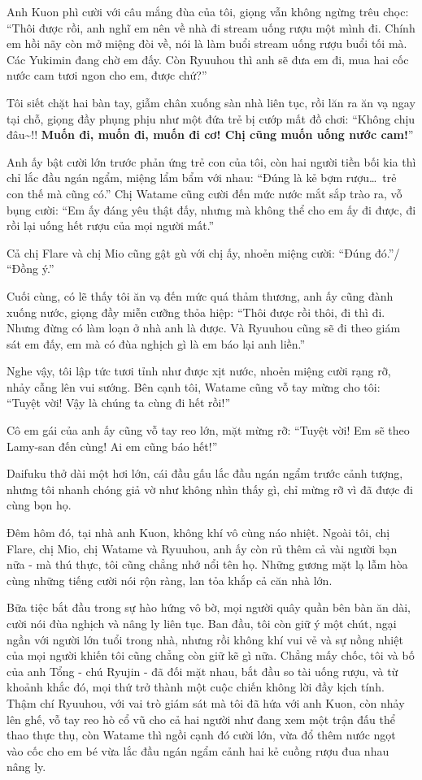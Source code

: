 \documentclass[../main.tex]{subfiles}
\begin{document}
Anh Kuon phì cười với câu mắng đùa của tôi, giọng vẫn không ngừng trêu chọc: ``Thôi được rồi, anh nghĩ em nên về nhà đi stream uống rượu một mình đi. Chính em hồi nãy còn mở miệng đòi về, nói là làm buổi stream uống rượu buổi tối mà. Các Yukimin đang chờ em đấy. Còn Ryuuhou thì anh sẽ đưa em đi, mua hai cốc nước cam tươi ngon cho em, được chứ?''

Tôi siết chặt hai bàn tay, giẫm chân xuống sàn nhà liên tục, rồi lăn ra ăn vạ ngay tại chỗ, giọng đầy phụng phịu như một đứa trẻ bị cướp mất đồ chơi: ``Không chịu đâu\~{}!! \textbf{Muốn đi, muốn đi, muốn đi cơ! Chị cũng muốn uống nước cam!}''

Anh ấy bật cười lớn trước phản ứng trẻ con của tôi, còn hai người tiền bối kia thì chỉ lắc đầu ngán ngẩm, miệng lẩm bẩm với nhau: ``Đúng là kẻ bợm rượu\dots\ trẻ con thế mà cũng có.'' Chị Watame cũng cười đến mức nước mắt sắp trào ra, vỗ bụng cười: ``Em ấy đáng yêu thật đấy, nhưng mà không thể cho em ấy đi được, đi rồi lại uống hết rượu của mọi người mất.''

Cả chị Flare và chị Mio cũng gật gù với chị ấy, nhoẻn miệng cười: ``Đúng đó.''/ ``Đồng ý.''

Cuối cùng, có lẽ thấy tôi ăn vạ đến mức quá thảm thương, anh ấy cũng đành xuống nước, giọng đầy miễn cưỡng thỏa hiệp: ``Thôi được rồi thôi, đi thì đi. Nhưng đừng có làm loạn ở nhà anh là được. Và Ryuuhou cũng sẽ đi theo giám sát em đấy, em mà có đùa nghịch gì là em báo lại anh liền.''

Nghe vậy, tôi lập tức tươi tỉnh như được xịt nước, nhoẻn miệng cười rạng rỡ, nhảy cẫng lên vui sướng. Bên cạnh tôi, Watame cũng vỗ tay mừng cho tôi: ``Tuyệt vời! Vậy là chúng ta cùng đi hết rồi!''

Cô em gái của anh ấy cũng vỗ tay reo lớn, mặt mừng rỡ: ``Tuyệt vời! Em sẽ theo Lamy-san đến cùng! Ai em cũng báo hết!''

Daifuku thở dài một hơi lớn, cái đầu gấu lắc đầu ngán ngẩm trước cảnh tượng, nhưng tôi nhanh chóng giả vờ như không nhìn thấy gì, chỉ mừng rỡ vì đã được đi cùng bọn họ.

\ct

Đêm hôm đó, tại nhà anh Kuon, không khí vô cùng náo nhiệt. Ngoài tôi, chị Flare, chị Mio, chị Watame và Ryuuhou, anh ấy còn rủ thêm cả vài người bạn nữa - mà thú thực, tôi cũng chẳng nhớ nổi tên họ. Những gương mặt lạ lẫm hòa cùng những tiếng cười nói rộn ràng, lan tỏa khắp cả căn nhà lớn.

Bữa tiệc bắt đầu trong sự hào hứng vô bờ, mọi người quây quần bên bàn ăn dài, cười nói đùa nghịch và nâng ly liên tục. Ban đầu, tôi còn giữ ý một chút, ngại ngần với người lớn tuổi trong nhà, nhưng rồi không khí vui vẻ và sự nồng nhiệt của mọi người khiến tôi cũng chẳng còn giữ kẽ gì nữa. Chẳng mấy chốc, tôi và bố của anh Tổng - chú Ryujin - đã đối mặt nhau, bắt đầu so tài uống rượu, và từ khoảnh khắc đó, mọi thứ trở thành một cuộc chiến không lời đầy kịch tính. Thậm chí Ryuuhou, với vai trò giám sát mà tôi đã hứa với anh Kuon, còn nhảy lên ghế, vỗ tay reo hò cổ vũ cho cả hai người như đang xem một trận đấu thể thao thực thụ, còn Watame thì ngồi cạnh đó cười lớn, vừa đổ thêm nước ngọt vào cốc cho em bé vừa lắc đầu ngán ngẩm cảnh hai kẻ cuồng rượu đua nhau nâng ly.
\end{document}
